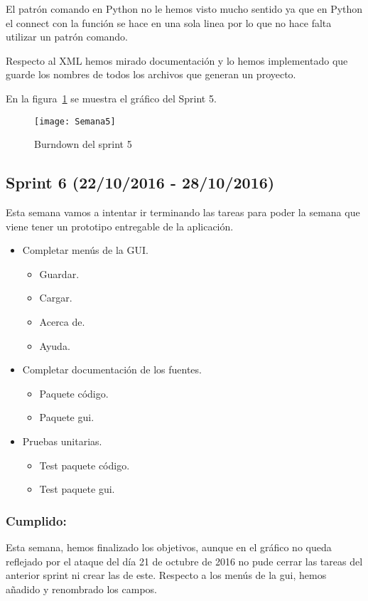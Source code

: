 El patrón comando en Python no le hemos visto mucho sentido ya que en Python el connect con la función se hace en una sola linea por lo que no hace falta utilizar un patrón comando.

Respecto al XML hemos mirado documentación y lo hemos implementado que guarde los nombres de todos los archivos que generan un proyecto.

En la figura~\ref{fig:A.2.5} se muestra el gráfico del Sprint 5.

\begin{figure}[h]
\centering
\texttt{[image: Semana5]}
\caption{Burndown del sprint 5}
\label{fig:A.2.5}
\end{figure}
\subsection{Sprint 6 (22/10/2016 - 28/10/2016)}
Esta semana vamos a intentar ir terminando las tareas para poder la semana que viene tener un prototipo entregable de la aplicación.

\begin{itemize}
\item Completar menús de la GUI.
	\begin{itemize}
		\item Guardar.
		\item Cargar.
		\item Acerca de.
		\item Ayuda.
	\end{itemize}
\item Completar documentación de los fuentes.
	\begin{itemize}
		\item Paquete código.
		\item Paquete gui.
	\end{itemize}
\item Pruebas unitarias.
	\begin{itemize}
		\item Test paquete código.
		\item Test paquete gui.
	\end{itemize}
\end{itemize}
\subsubsection{Cumplido:}
Esta semana, hemos finalizado los objetivos, aunque en el gráfico no queda reflejado por el ataque del día 21 de octubre de 2016 \cite{wiki:Dyn} no pude cerrar las tareas del anterior sprint ni crear las de este.
Respecto a los menús de la gui, hemos añadido y renombrado los campos.


